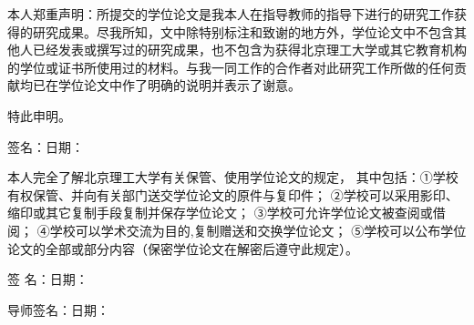 \newpage\thispagestyle{empty}
\begin{center}
\heiti\textbf{}
\end{center}

本人郑重声明：所提交的学位论文是我本人在指导教师的指导下进行的研究工作获得的研究成果。尽我所知，文中除特别标注和致谢的地方外，学位论文中不包含其他人已经发表或撰写过的研究成果，也不包含为获得北京理工大学或其它教育机构的学位或证书所使用过的材料。与我一同工作的合作者对此研究工作所做的任何贡献均已在学位论文中作了明确的说明并表示了谢意。

特此申明。
\begin{flushright}
签名：\qquad\qquad\qquad\qquad\qquad 日期：\qquad\qquad\qquad\qquad\qquad\qquad\qquad
\end{flushright}

\hfill

\textbf{\chuhaozi{}}
\begin{center}
\heiti\textbf{}
\end{center}

本人完全了解北京理工大学有关保管、使用学位论文的规定，
其中包括：①学校有权保管、并向有关部门送交学位论文的原件与复印件；
②学校可以采用影印、缩印或其它复制手段复制并保存学位论文；
③学校可允许学位论文被查阅或借阅；
④学校可以学术交流为目的,复制赠送和交换学位论文；
⑤学校可以公布学位论文的全部或部分内容（保密学位论文在解密后遵守此规定）。
\begin{flushright}
签 名：\qquad\qquad\qquad\qquad\qquad 日期：\qquad\qquad\qquad\qquad\qquad\qquad

导师签名：\qquad\qquad\qquad \qquad\qquad 日期：\qquad\qquad\qquad\qquad\qquad\qquad\qquad
\end{flushright} 